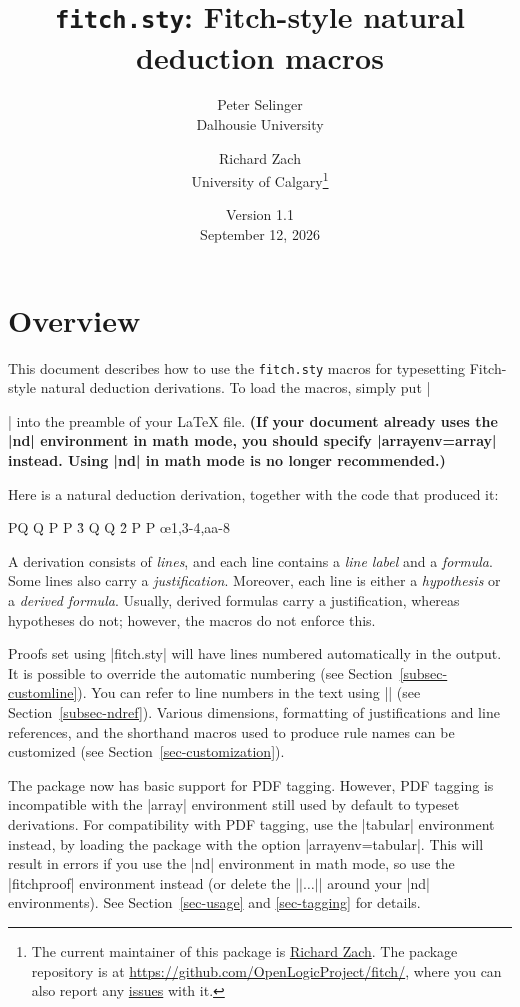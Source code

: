 \documentclass{ltxdoc}
\title{\texttt{fitch.sty}: Fitch-style natural deduction macros}
\author{Peter Selinger\\Dalhousie University \and Richard
Zach\\University of Calgary\thanks{The current maintainer of this
package is \href{https://richardzach.org}{Richard Zach}. The package
repository is at \url{https://github.com/OpenLogicProject/fitch/},
where you can also report any
\href{https://github.com/OpenLogicProject/fitch/issues}{issues} with
it.}}
\date{Version 1.1\\ September 12, 2026}
\newcommand\NewIn[1]{\leavevmode
  \marginpar{\hfill\fbox{\fbox{New in #1}}\hspace*{1em}}\ignorespaces}
\begin{document}
\maketitle

\section{Overview}

This document describes how to use the {\tt fitch.sty} macros for
typesetting Fitch-style natural deduction derivations. To load the
macros, simply put |\usepackage[arrayenv=tabular]{fitch}| into the
preamble of your {\LaTeX} file. \NewIn{1.1}\textbf{(If your document
already uses the |nd| environment in math mode, you should specify
|arrayenv=array| instead. Using |nd| in math mode is no longer
recommended.)}

Here is a natural deduction derivation, together with the code that
produced it:

\begin{LTXexample}
\begin{fitchproof}
    {P\vee Q}
    {\neg Q}
  \open
   {P}
   {P}        \r{3}
  \close
  \open
   {Q}
   {\neg Q}   \r{2}
   {\bot}     
   {P}        
  \close
   {P}        \oe{1,3-4,aa-8}
\end{fitchproof}
\end{LTXexample}

A derivation consists of \emph{lines}, and each line contains a {\em
line label} and a \emph{formula}. Some lines also carry a {\em
justification}. Moreover, each line is either a \emph{hypothesis} or a
\emph{derived formula}. Usually, derived formulas carry a
justification, whereas hypotheses do not; however, the macros do not
enforce this.

Proofs set using |fitch.sty| will have lines numbered automatically in
the output. It is possible to override the automatic numbering (see
Section~\ref{subsec-customline}). You can refer to line numbers in the
text using |\ndref| (see Section~\ref{subsec-ndref}). Various
dimensions, formatting of justifications and line references, and the
shorthand macros used to produce rule names can be customized (see
Section~\ref{sec-customization}).

\NewIn{1.1} The package now has basic support for PDF tagging.
However, PDF tagging is incompatible with the |array| environment
still used by default to typeset derivations. For compatibility with
PDF tagging, use the |tabular| environment instead, by loading the
package with the option |arrayenv=tabular|. This will result in errors
if you use the |nd| environment in math mode, so use the |fitchproof|
environment instead (or delete the |$|\dots|$| around your |nd|
environments). See Section~\ref{sec-usage} and \ref{sec-tagging} for
details.
\end{document}
